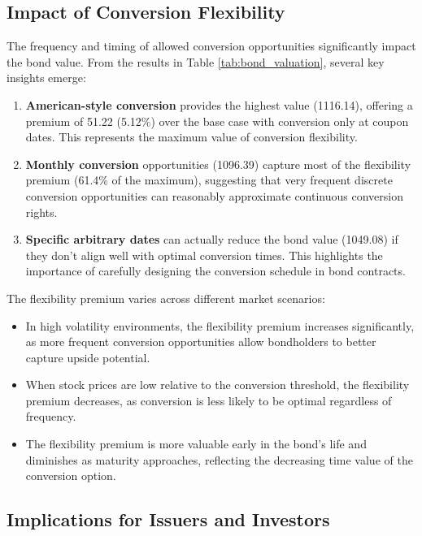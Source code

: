 
\subsection{Impact of Conversion Flexibility}

The frequency and timing of allowed conversion opportunities significantly impact the bond value. From the results in Table \ref{tab:bond_valuation}, several key insights emerge:

\begin{enumerate}
    \item \textbf{American-style conversion} provides the highest value (1116.14), offering a premium of 51.22 (5.12\%) over the base case with conversion only at coupon dates. This represents the maximum value of conversion flexibility.
    
    \item \textbf{Monthly conversion} opportunities (1096.39) capture most of the flexibility premium (61.4\% of the maximum), suggesting that very frequent discrete conversion opportunities can reasonably approximate continuous conversion rights.
    
    \item \textbf{Specific arbitrary dates} can actually reduce the bond value (1049.08) if they don't align well with optimal conversion times. This highlights the importance of carefully designing the conversion schedule in bond contracts.
\end{enumerate}

The flexibility premium varies across different market scenarios:

\begin{itemize}
    \item In high volatility environments, the flexibility premium increases significantly, as more frequent conversion opportunities allow bondholders to better capture upside potential.
    
    \item When stock prices are low relative to the conversion threshold, the flexibility premium decreases, as conversion is less likely to be optimal regardless of frequency.
    
    \item The flexibility premium is more valuable early in the bond's life and diminishes as maturity approaches, reflecting the decreasing time value of the conversion option.
\end{itemize}

\subsection{Implications for Issuers and Investors}

